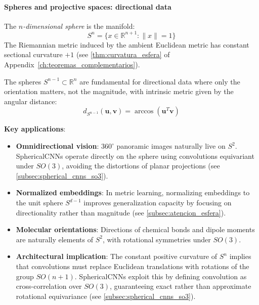 \paragraph{Spheres and projective spaces: directional data}

\begin{definition}\label{def:esfera_n}
The \textit{$n$-dimensional sphere} is the manifold:
\[
S^n = \{x \in \mathbb{R}^{n+1} : \|x\| = 1\}
\]
The Riemannian metric induced by the ambient Euclidean metric has constant sectional curvature $+1$ (see \autoref{thm:curvatura_esfera} of Appendix~\ref{ch:teoremas_complementarios}).
\end{definition}

The spheres $S^{n-1} \subset \mathbb{R}^n$ are fundamental for directional data where only the orientation matters, not the magnitude, with intrinsic metric given by the angular distance:
\[
d_{S^{n-1}}(\mathbf{u}, \mathbf{v}) = \arccos(\mathbf{u}^T \mathbf{v})
\]

\textbf{Key applications}:
\begin{itemize}
    \item \textbf{Omnidirectional vision}: $360^\circ$ panoramic images naturally live on $S^2$. \glspl{SphericalCNN} \citep{cohen2018sphericalcnns} operate directly on the sphere using convolutions equivariant under $SO(3)$, avoiding the distortions of planar projections (see \autoref{subsec:spherical_cnns_so3}).

    \item \textbf{Normalized embeddings}: In metric learning, normalizing embeddings to the unit sphere $S^{d-1}$ improves generalization capacity by focusing on directionality rather than magnitude \citep{wang2017normface} (see \autoref{subsec:atencion_esfera}).

    \item \textbf{Molecular orientations}: Directions of chemical bonds and dipole moments are naturally elements of $S^2$, with rotational symmetries under $SO(3)$.

    \item \textbf{Architectural implication}: The constant positive curvature of $S^n$ implies that convolutions must replace Euclidean translations with rotations of the group $SO(n+1)$. \glspl{SphericalCNN} exploit this by defining convolution as cross-correlation over $SO(3)$, guaranteeing exact rather than approximate rotational equivariance (see \autoref{subsec:spherical_cnns_so3}).
\end{itemize}


